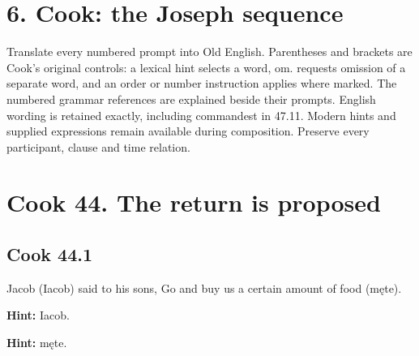 




\section*{6. Cook: the Joseph sequence}

Translate every numbered prompt into Old English. Parentheses and brackets are Cook’s original controls: a lexical hint selects a word, om. requests omission of a separate word, and an order or number instruction applies where marked. The numbered grammar references are explained beside their prompts. English wording is retained exactly, including commandest in 47.11. Modern hints and supplied expressions remain available during composition. Preserve every participant, clause and time relation.

\section*{Cook 44. The return is proposed}

\par\begin{minipage}{\linewidth}\raggedright
\subsection*{Cook 44.1}

Jacob (Iacob) said to his sons, Go and buy us a certain amount of food (męte).

\textbf{Hint:} Iacob.

\textbf{Hint:} męte.

\end{minipage}\par\addvspace{4pt}

